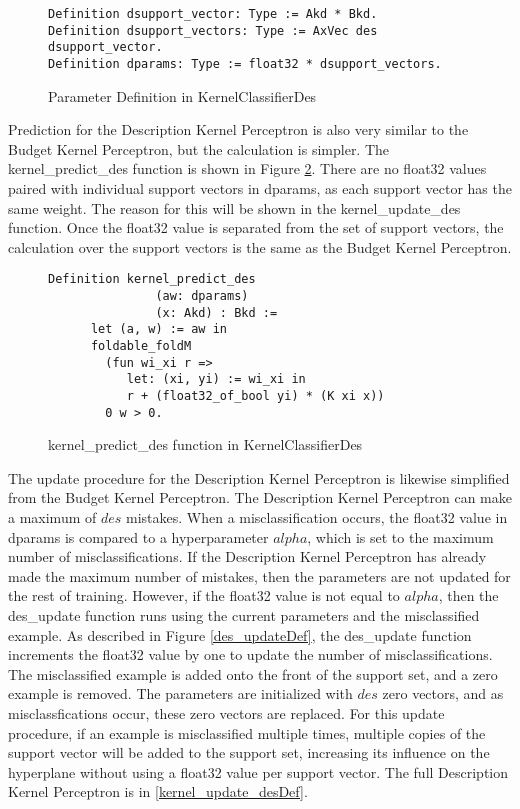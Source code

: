 \begin{figure}
    \caption{Parameter Definition in KernelClassifierDes}
    \label{KPDsupportDef}
    \begin{lstlisting}
Definition dsupport_vector: Type := Akd * Bkd.
Definition dsupport_vectors: Type := AxVec des dsupport_vector.
Definition dparams: Type := float32 * dsupport_vectors.
    \end{lstlisting}
\end{figure}

Prediction for the Description Kernel Perceptron is also very similar to the Budget Kernel Perceptron, but the calculation is simpler. The kernel\_predict\_des function is shown in Figure \ref{kernel_predict_desDef}. There are no float32 values paired with individual support vectors in dparams, as each support vector has the same weight. The reason for this will be shown in the kernel\_update\_des function. Once the float32 value is separated from the set of support vectors, the calculation over the support vectors is the same as the Budget Kernel Perceptron.

\begin{figure}
    \caption{kernel\_predict\_des function in KernelClassifierDes}
    \label{kernel_predict_desDef}
    \begin{lstlisting}
Definition kernel_predict_des
               (aw: dparams)
               (x: Akd) : Bkd :=
      let (a, w) := aw in
      foldable_foldM
        (fun wi_xi r =>
           let: (xi, yi) := wi_xi in 
           r + (float32_of_bool yi) * (K xi x))
        0 w > 0.
    \end{lstlisting}
\end{figure}

The update procedure for the Description Kernel Perceptron is likewise simplified from the Budget Kernel Perceptron. The Description Kernel Perceptron can make a maximum of $des$ mistakes. When a misclassification occurs, the float32 value in dparams is compared to a hyperparameter $alpha$, which is set to the maximum number of misclassifications. If the Description Kernel Perceptron has already made the maximum number of mistakes, then the parameters are not updated for the rest of training. However, if the float32 value is not equal to $alpha$, then the des\_update function runs using the current parameters and the misclassified example. As described in Figure \ref{des_updateDef}, the des\_update function increments the float32 value by one to update the number of misclassifications. The misclassified example is added onto the front of the support set, and a zero example is removed. The parameters are initialized with $des$ zero vectors, and as misclassfications occur, these zero vectors are replaced. For this update procedure, if an example is misclassified multiple times, multiple copies of the support vector will be added to the support set, increasing its influence on the hyperplane without using a float32 value per support vector. The full Description Kernel Perceptron is in \ref{kernel_update_desDef}.


